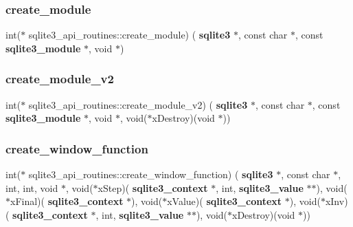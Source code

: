 \mbox{\label{structsqlite3__api__routines_a0d2bee02b4c2ce95aa3ae6d4b904bff6}} 
\subsubsection{create\_module}
{\footnotesize\ttfamily int($\ast$ sqlite3\+\_\+api\+\_\+routines\+::create\+\_\+module) (\textbf{ sqlite3} $\ast$, const char $\ast$, const \textbf{ sqlite3\+\_\+module} $\ast$, void $\ast$)}

\mbox{\label{structsqlite3__api__routines_aa460b2835f8b644e463842963b98f707}} 
\subsubsection{create\_module\_v2}
{\footnotesize\ttfamily int($\ast$ sqlite3\+\_\+api\+\_\+routines\+::create\+\_\+module\+\_\+v2) (\textbf{ sqlite3} $\ast$, const char $\ast$, const \textbf{ sqlite3\+\_\+module} $\ast$, void $\ast$, void($\ast$x\+Destroy)(void $\ast$))}

\mbox{\label{structsqlite3__api__routines_ab4d05ca442823cbaaa94830ef4f3da02}} 
\subsubsection{create\_window\_function}
{\footnotesize\ttfamily int($\ast$ sqlite3\+\_\+api\+\_\+routines\+::create\+\_\+window\+\_\+function) (\textbf{ sqlite3} $\ast$, const char $\ast$, int, int, void $\ast$, void($\ast$x\+Step)(\textbf{ sqlite3\+\_\+context} $\ast$, int, \textbf{ sqlite3\+\_\+value} $\ast$$\ast$), void($\ast$x\+Final)(\textbf{ sqlite3\+\_\+context} $\ast$), void($\ast$x\+Value)(\textbf{ sqlite3\+\_\+context} $\ast$), void($\ast$x\+Inv)(\textbf{ sqlite3\+\_\+context} $\ast$, int, \textbf{ sqlite3\+\_\+value} $\ast$$\ast$), void($\ast$x\+Destroy)(void $\ast$))}

\mbox{\label{structsqlite3__api__routines_a4d248c8b990dc7b96c5734ec878508a0}} 
